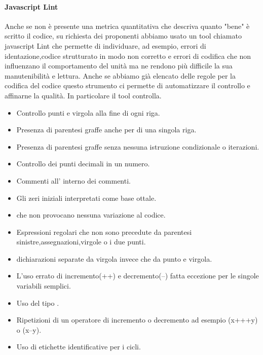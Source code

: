 \paragraph{Javascript Lint}
Anche se non è presente una metrica quantitativa che descriva quanto "bene" è scritto il codice, su richiesta dei proponenti abbiamo usato un tool chiamato javascript Lint che permette di individuare, ad esempio, errori di identazione,codice strutturato in modo non corretto e errori di codifica che non influenzano il comportamento del unità ma ne rendono più difficile la sua manutenibilità e lettura.
Anche se abbiamo già elencato delle regole per la codifica del codice questo strumento ci permette di automatizzare il controllo e affinarne la qualità.
In particolare il tool  controlla.
\begin{itemize}
\item Controllo punti e virgola alla fine di ogni riga.
\item Presenza di parentesi graffe anche per  di una singola riga.
\item Presenza di parentesi graffe senza nessuna istruzione condizionale o iterazioni.
\item Controllo dei punti decimali in un numero.
\item Commenti all' interno dei commenti.
\item Gli zeri iniziali interpretati come base ottale. 
\item {} che non provocano nessuna variazione al codice.
\item Espressioni regolari che non sono precedute da parentesi sinistre,assegnazioni,virgole o i due punti.
\item dichiarazioni separate da virgola invece che da punto e virgola.
\item L'uso errato di incremento(++) e decremento(--) fatta eccezione per le singole variabili semplici.
\item Uso del tipo .
\item Ripetizioni di un operatore di incremento o decremento ad esempio (x+++y) o (x--y).
\item Uso di etichette identificative per i cicli.
\end{itemize}

